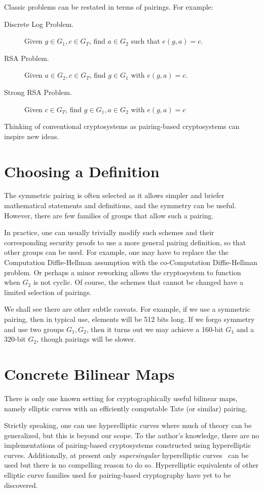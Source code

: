 Classic problems can be restated in terms of
pairings. For example:

\begin{description}
\item[Discrete Log Problem.]
Given $g \in G_1, c \in G_T$, find $a \in G_2$ such that $e(g,a) = c$.
\item[RSA Problem.]
Given $a \in G_2, c \in G_T$, find $g \in G_1$ with
$e(g,a) = c$.
\item[Strong RSA Problem.]
Given $c \in G_T$, find $g \in G_1, a\in G_2$ with
$e(g,a) = c$
\end{description}

Thinking of conventional cryptosystems as pairing-based cryptosystems
can inspire new ideas.

\section{Choosing a Definition}

The symmetric pairing is often selected
as it allows simpler and briefer mathematical statements and definitions,
and the symmetry can be useful.
However, there are few families of groups that allow such a pairing.

In practice, one can usually trivially modify such
schemes and their corresponding
security proofs to use a more general pairing definition,
so that other groups can be used. For example, one may have to replace the
the Computation Diffie-Hellman assumption with
the co-Computation Diffie-Hellman problem. Or perhaps
a minor reworking allows the cryptosystem to function when $G_2$
is not cyclic.
Of course, the schemes that cannot be changed have a limited selection
of pairings.

We shall see there are other subtle caveats.
For example, if we use a symmetric pairing, then in typical use,
elements will be 512 bits long.
If we forgo symmetry and use two groups $G_1, G_2$,
then it turns out we may achieve a 160-bit $G_1$ and a 320-bit $G_2$,
though pairings will be slower.

\section{Concrete Bilinear Maps}

There is only one known setting for cryptographically useful bilinear maps,
namely elliptic curves with an efficiently computable
Tate (or similar) pairing.

Strictly speaking, one can use hyperelliptic
curves where much of theory can be generalized, but this is beyond
our scope. To the author's knowledge, there are no implementations
of pairing-based cryptosystems constructed using hyperelliptic curves.
Additionally, at present only \emph{supersingular} hyperelliptic
curves~\cite{galbraith,rubinsilverberg} can be used but there is no compelling
reason to do so.
Hyperelliptic equivalents of other elliptic curve families
used for pairing-based cryptography have yet to be discovered.

